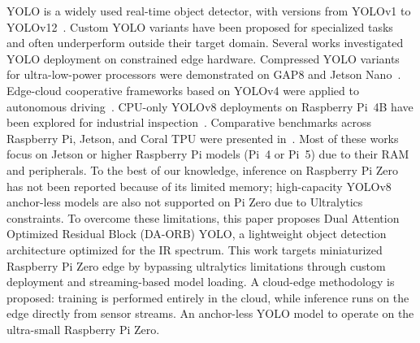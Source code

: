 \documentclass[journal,twoside,web]{ieeecolor}
\begin{document}
YOLO is a widely used real-time object detector, with versions from YOLOv1 to YOLOv12~\cite{redmon2016you,lin2017focal,wang2021scaled,wang2023yolov7,li2023yolov6,carion2020end}. Custom YOLO variants have been proposed for specialized tasks~\cite{wang2020eca,hou2021coordinate,misra2021triplet} and often underperform outside their target domain. Several works investigated YOLO deployment on constrained edge hardware. Compressed YOLO variants for ultra-low-power processors were demonstrated on GAP8 and Jetson Nano~\cite{humes2023squeezed}. Edge-cloud cooperative frameworks based on YOLOv4 were applied to autonomous driving~\cite{liang2022edge}. CPU-only YOLOv8 deployments on Raspberry Pi~4B have been explored for industrial inspection~\cite{okano2025edge}. Comparative benchmarks across Raspberry Pi, Jetson, and Coral TPU were presented in~\cite{alqahtani2024benchmarking}. Most of these works focus on Jetson or higher Raspberry Pi models (Pi~4 or Pi~5) due to their RAM and peripherals. To the best of our knowledge, inference on Raspberry Pi Zero has not been reported because of its limited memory; high-capacity YOLOv8 anchor-less models are also not supported on Pi Zero due to Ultralytics constraints. To overcome these limitations, this paper proposes Dual Attention Optimized Residual Block (DA-ORB) YOLO, a lightweight object detection architecture optimized for the IR spectrum. %
This work targets miniaturized Raspberry Pi Zero edge by bypassing ultralytics limitations through custom deployment and streaming-based model loading. A cloud-edge methodology is proposed: training is performed entirely in the cloud, while inference runs on the edge directly from sensor streams. An anchor-less YOLO model to operate on the ultra-small Raspberry Pi Zero.
\end{document}
